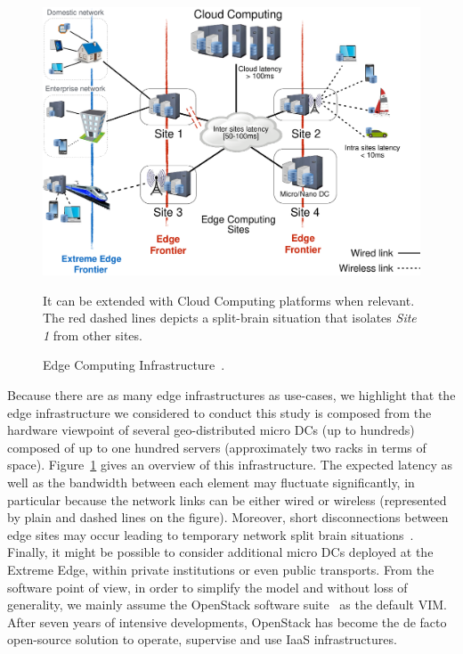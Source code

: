 \begin{figure}[t]
  \centering
  \includegraphics[width=\columnwidth]{./figures/figure_fog.pdf}
  \caption{Edge Computing Infrastructure~\cite{7923796}.}
    {\small It can be extended with Cloud Computing
    platforms when relevant.  The red dashed lines depicts a split-brain situation that isolates
    \emph{Site 1} from other sites.}
  \label{fig:fogedge-archi}
\end{figure}

Because there are as many edge infrastructures as use-cases, we
highlight that the edge infrastructure we considered to conduct this
study is composed from the hardware viewpoint of several
geo-distributed micro DCs (up to hundreds)
composed of up to one hundred servers (approximately two racks in terms of space).
Figure~\ref{fig:fogedge-archi} gives an overview of this
infrastructure. The expected latency as well as the bandwidth between
each element may fluctuate significantly, in particular because the
network links can be either wired or wireless (represented by plain
and dashed lines on the figure). Moreover, short disconnections
between edge sites may occur leading to temporary network split brain
situations~\cite{4456903}. Finally, it might be possible
to consider additional micro DCs deployed at the Extreme Edge, within
private institutions or even public transports.
%
From the software point of view, in order to simplify the model and
without loss of generality, we mainly assume the OpenStack software
suite~\cite{openstack:www} as the default VIM.  After seven years of intensive developments, OpenStack has
become the de facto open-source solution to operate, supervise and use
IaaS infrastructures.

